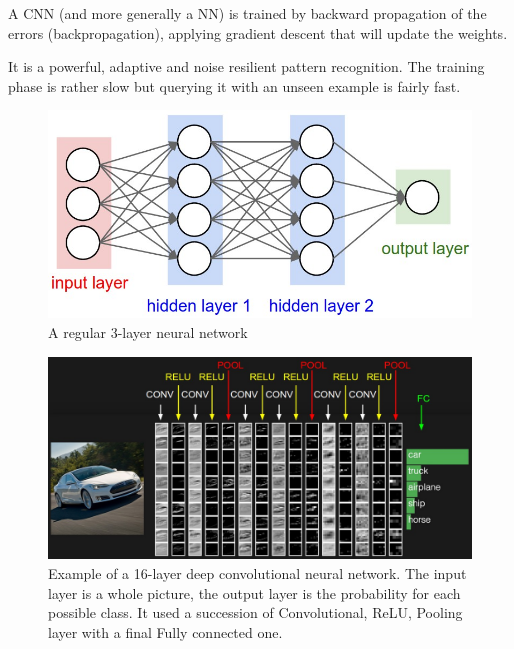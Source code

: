 A CNN (and more generally a NN) is trained by backward propagation of the errors (backpropagation), applying gradient descent that will update the weights.

It is a powerful, adaptive and noise resilient pattern recognition. The training phase is rather slow but querying it with an unseen example is fairly fast.

\begin{figure}[h]
    \centering
    \includegraphics[scale=0.4]{img/nn_3_layers.jpeg}
    \caption{A regular 3-layer neural network}
    \label{fig:nn_3_layer}
\end{figure}

\begin{figure}[h]
    \includegraphics[scale=0.35]{img/cnn_simple_example.jpeg}
    \caption[Example of a 16-layer deep convolutional neural network]{Example of a 16-layer deep convolutional neural network. The input layer is a whole picture, the output layer is the probability for each possible class. It used a succession of Convolutional, ReLU, Pooling layer with a final Fully connected one.}
    \label{fig:cnn_simple_example}
\end{figure}

